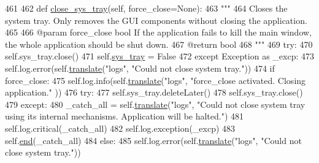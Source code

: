 \begin{DoxyCode}
461 
462     \textcolor{keyword}{def }\hyperlink{classcommotion__client_1_1commotion__client_1_1CommotionClientApplication_a2a0f0cfc9ca6a62a2aaa90bdc8bca1fc}{close\_sys\_tray}(self, force\_close=None):
463         \textcolor{stringliteral}{"""}
464 \textcolor{stringliteral}{        Closes the system tray. Only removes the GUI components without closing the application.}
465 \textcolor{stringliteral}{}
466 \textcolor{stringliteral}{        @param force\_close bool If the application fails to kill the main window, the whole application
       should be shut down.}
467 \textcolor{stringliteral}{        @return bool }
468 \textcolor{stringliteral}{        """}
469         \textcolor{keywordflow}{try}:
470             self.sys\_tray.close()
471             self.\hyperlink{classcommotion__client_1_1commotion__client_1_1CommotionClientApplication_a48a8bf39339f834c94353ca68444176f}{sys\_tray} = \textcolor{keyword}{False}
472         \textcolor{keywordflow}{except} Exception \textcolor{keyword}{as} \_excp:
473             self.log.error(self.\hyperlink{classcommotion__client_1_1commotion__client_1_1CommotionClientApplication_a57e951c9b241fb0e0c70055b4ca1b6f7}{translate}(\textcolor{stringliteral}{"logs"}, \textcolor{stringliteral}{"Could not close system tray."}))
474             \textcolor{keywordflow}{if} force\_close:
475                 self.log.info(self.\hyperlink{classcommotion__client_1_1commotion__client_1_1CommotionClientApplication_a57e951c9b241fb0e0c70055b4ca1b6f7}{translate}(\textcolor{stringliteral}{"logs"}, \textcolor{stringliteral}{"force\_close activated. Closing application."}
      ))
476                 \textcolor{keywordflow}{try}:
477                     self.sys\_tray.deleteLater()
478                     self.sys\_tray.close()
479                 \textcolor{keywordflow}{except}:
480                     \_catch\_all = self.\hyperlink{classcommotion__client_1_1commotion__client_1_1CommotionClientApplication_a57e951c9b241fb0e0c70055b4ca1b6f7}{translate}(\textcolor{stringliteral}{"logs"}, \textcolor{stringliteral}{"Could not close system tray using its
       internal mechanisms. Application will be halted."})
481                     self.log.critical(\_catch\_all)
482                     self.log.exception(\_excp)
483                     self.\hyperlink{classcommotion__client_1_1commotion__client_1_1CommotionClientApplication_af2043aac2ebc25f55b73ec317d6ea463}{end}(\_catch\_all)
484             \textcolor{keywordflow}{else}:
485                 self.log.error(self.\hyperlink{classcommotion__client_1_1commotion__client_1_1CommotionClientApplication_a57e951c9b241fb0e0c70055b4ca1b6f7}{translate}(\textcolor{stringliteral}{"logs"}, \textcolor{stringliteral}{"Could not close system tray."}))

\end{DoxyCode}
